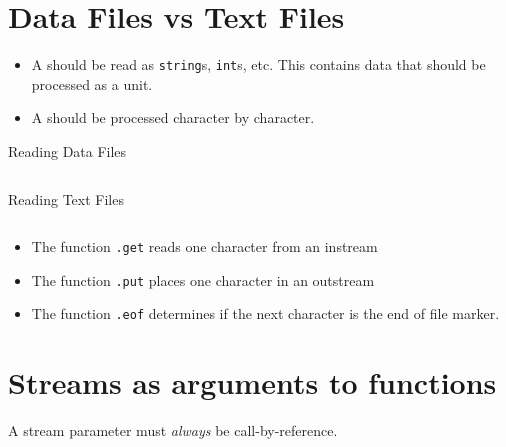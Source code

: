 \documentclass[\main/notes.tex]{subfiles}
\begin{document}
		\section{Data Files vs Text Files}
			\begin{itemize}
				\item A  should be read as \texttt{string}s, \texttt{int}s, etc. This contains data that should be processed as a unit.
				\item A  should be processed character by character.
			\end{itemize}
			\begin{codebox}{Reading Data Files}
				\inputminted[]{cpp}{\subfix{code/02_data_files.cpp}}
			\end{codebox}
			\pagebreak
			\begin{codebox}{Reading Text Files}
				\inputminted[]{cpp}{\subfix{code/03_text_files.cpp}}
			\end{codebox}
			\begin{itemize}[nosep]
				\item The function \texttt{.get} reads one character from an instream
				\item The function \texttt{.put} places one character in an outstream
				\item The function \texttt{.eof} determines if the next character is the end of file marker.
			\end{itemize}

		\section{Streams as arguments to functions}
			A stream parameter must \emph{always} be call-by-reference.

\end{document}
